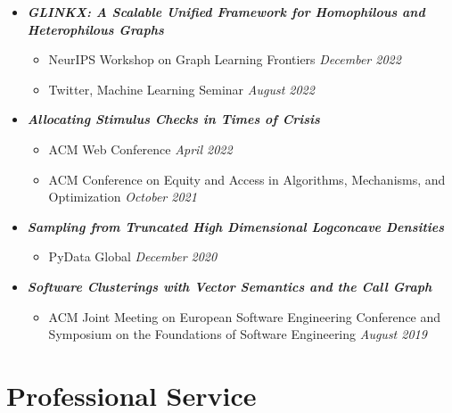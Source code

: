 \documentclass[margin]{res}
\newcommand{\bemph}[1]{\textbf{\emph{#1}}}
\begin{document}
\begin{resume}
\begin{itemize}[nosep]
	\item \bemph{GLINKX: A Scalable Unified Framework for Homophilous and Hetero\-philous Graphs}
	\begin{itemize}[nosep]
		\item NeurIPS Workshop on Graph Learning Frontiers  \hfill \emph{December 2022}
		\item Twitter, Machine Learning Seminar \hfill \emph{August 2022}
		
	\end{itemize}

 
	\item \bemph{Allocating Stimulus Checks in Times of Crisis} 
	\begin{itemize}[nosep]
		\item ACM Web Conference \hfill \emph{April 2022}
		\item ACM Conference on Equity and Access in Algorithms, Mechanisms, and Optimization \hfill \emph{October 2021}
	\end{itemize}

	\item \bemph{Sampling from Truncated High Dimensional Logconcave Densities}
	\begin{itemize}[nosep]
		\item PyData Global \hfill \emph{December 2020}
	\end{itemize}
	
	\item \bemph{Software Clusterings with Vector Semantics and the Call Graph}
	\begin{itemize}[nosep]
		\item ACM Joint Meeting on European Software Engineering Conference and Symposium on the Foundations of Software Engineering \hfill \emph{August 2019}
	\end{itemize} 
	
\end{itemize}

\section{Professional Service}


\end{resume}
\end{document}
